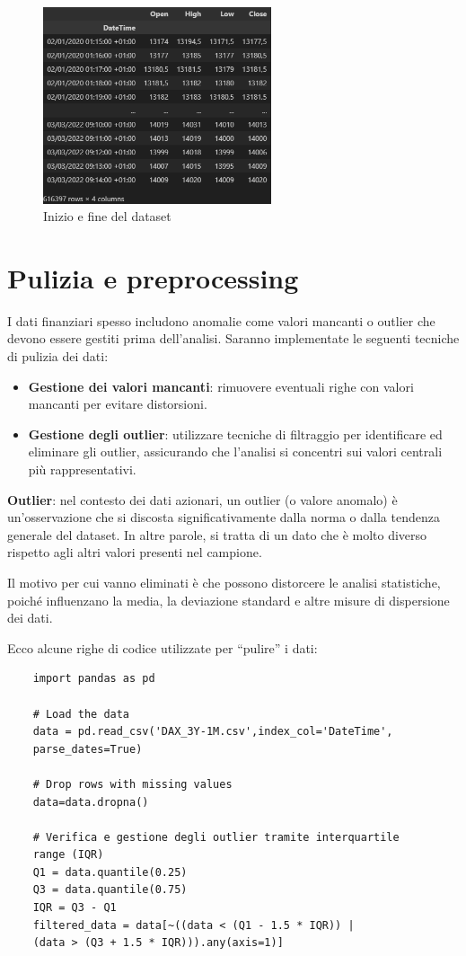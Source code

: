 \documentclass[%
	corpo=11pt,
    twoside,
    stile=classica,
    oldstyle,
    tipotesi=custom,
    greek,
    evenboxes,
]{toptesi}
\begin{document}
\begin{figure}[h]
	\centering
	\includegraphics[width=0.6\textwidth]{./Pictures/dfDax.png}
	\caption{Inizio e fine del dataset}
	\label{fig:dataset}
\end{figure}

\section{Pulizia e preprocessing}

I dati finanziari spesso includono anomalie come valori mancanti o outlier che devono essere gestiti prima dell’analisi. Saranno implementate le seguenti tecniche di pulizia dei dati:
\begin{itemize}
	\item \textbf{Gestione dei valori mancanti}: rimuovere eventuali righe con valori mancanti per evitare distorsioni.
	\item \textbf{Gestione degli outlier}: utilizzare tecniche di filtraggio per identificare ed eliminare gli outlier, assicurando che l’analisi si concentri sui valori centrali più rappresentativi.
\end{itemize}
\textbf{Outlier}: nel contesto dei dati azionari, un outlier (o valore anomalo) è un’osservazione che si discosta significativamente dalla norma o dalla tendenza generale del dataset. In altre parole, si tratta di un dato che è molto diverso rispetto agli altri valori presenti nel campione.

Il motivo per cui vanno eliminati è che possono distorcere le analisi statistiche, poiché influenzano la media, la deviazione standard e altre misure di dispersione dei dati.

Ecco alcune righe di codice utilizzate per ``pulire'' i dati:
\begin{verbatim}
	import pandas as pd
	
	# Load the data
	data = pd.read_csv('DAX_3Y-1M.csv',index_col='DateTime',
	parse_dates=True)
	
	# Drop rows with missing values
	data=data.dropna()
	
	# Verifica e gestione degli outlier tramite interquartile
	range (IQR)
	Q1 = data.quantile(0.25)
	Q3 = data.quantile(0.75)
	IQR = Q3 - Q1
	filtered_data = data[~((data < (Q1 - 1.5 * IQR)) | 
	(data > (Q3 + 1.5 * IQR))).any(axis=1)]
\end{verbatim}
\end{document}
